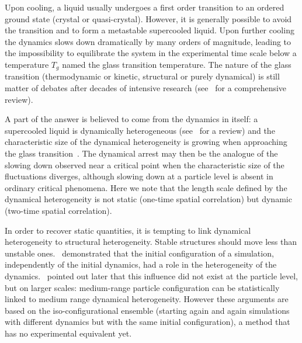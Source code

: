 
Upon cooling, a liquid usually undergoes a first order transition to an ordered ground state (crystal or quasi-crystal). However, it is generally possible to avoid the transition and to form a metastable supercooled liquid. Upon further cooling the dynamics slows down dramatically by many orders of magnitude, leading to the impossibility to equilibrate the system in the experimental time scale below a temperature $T_g$ named the glass transition temperature. The nature of the glass transition (thermodynamic or kinetic, structural or purely dynamical) is still matter of debates after decades of intensive research (see~\citep{cavagna2009supercooled,BerthierR} for a comprehensive review).

A part of the answer is believed to come from the dynamics in itself: a supercooled liquid is dynamically heterogeneous (see~\citep{BerthierR} for a review) and the characteristic size of the dynamical heterogeneity is growing when approaching the glass transition~\citep{Donati1999}. The dynamical arrest may then be the analogue of the slowing down observed near a critical point when the characteristic size of the fluctuations diverges, although slowing down at a particle level is absent in ordinary critical phenomena. Here we note that the length scale defined by the dynamical heterogeneity is not static (one-time spatial correlation) but dynamic (two-time spatial correlation). 

In order to recover static quantities, it is tempting to link dynamical heterogeneity to structural heterogeneity. Stable structures should move less than unstable ones.~\citet{Widmer-Cooper2005} demonstrated that the initial configuration of a simulation, independently of the initial dynamics, had a role in the heterogeneity of the dynamics.~\citet{Berthier2007} pointed out later that this influence did not exist at the particle level, but on larger scales: medium-range particle configuration can be statistically linked to medium range dynamical heterogeneity. However these arguments are based on the iso-configurational ensemble (starting again and again simulations with different dynamics but with the same initial configuration), a method that has no experimental equivalent yet.

